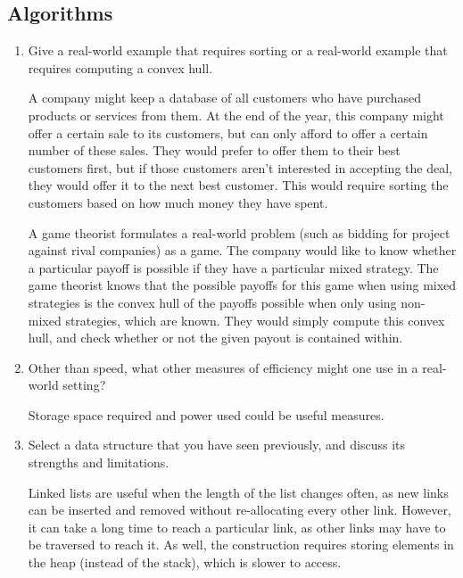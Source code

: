\documentclass[Chapter01]{subfiles}
\begin{document}
	\subsection{Algorithms}

	\begin{enumerate}[leftmargin=\labelsep]
		\item Give a real-world example that requires sorting or a real-world example that requires computing a convex hull.
		\begin{answer}
			A company might keep a database of all customers who have purchased products or services from them. At the end of the year, this company might offer a certain sale to its customers, but can only afford to offer a certain number of these sales. They would prefer to offer them to their best customers first, but if those customers aren't interested in accepting the deal, they would offer it to the next best customer. This would require sorting the customers based on how much money they have spent.
			
			A game theorist formulates a real-world problem (such as bidding for project against rival companies) as a game. The company would like to know whether a particular payoff is possible if they have a particular mixed strategy. The game theorist knows that the possible payoffs for this game when using mixed strategies is the convex hull of the payoffs possible when only using non-mixed strategies, which are known. They would simply compute this convex hull, and check whether or not the given payout is contained within.
		\end{answer}

		\item Other than speed, what other measures of efficiency might one use in a real-world setting?
		\begin{answer}
			Storage space required and power used could be useful measures.
		\end{answer}

		\item Select a data structure that you have seen previously, and discuss its strengths and limitations.
		\begin{answer}
			Linked lists are useful when the length of the list changes often, as new links can be inserted and removed without re-allocating every other link. However, it can take a long time to reach a particular link, as other links may have to be traversed to reach it. As well, the construction requires storing elements in the heap (instead of the stack), which is slower to access.
		\end{answer}


\end{enumerate}
\end{document}
